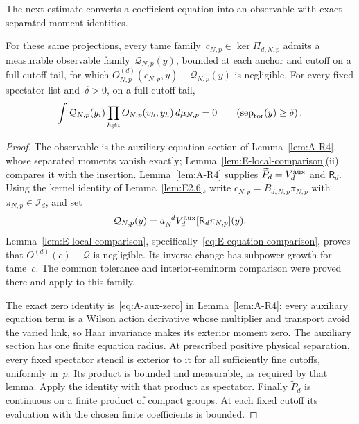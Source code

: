 The next estimate converts a coefficient equation into an observable with exact separated moment identities.
\begin{lemma}\label{lem:E2.7}
For these same projections, every tame family~$c_{N,p}\in\ker\Pi_{d,N,p}$ admits a measurable observable family~$\mathcal Q_{N,p}(y)$, bounded at each anchor and cutoff on a full cutoff tail, for which $O^{(d)}_{N,p}(c_{N,p},y)-\mathcal Q_{N,p}(y)$ is negligible. For every fixed spectator list and~$\delta>0$, on a full cutoff tail,
\begin{equation*}
\int \mathcal Q_{N,p}(y_i)\prod_{h\ne i}O_{N,p}(v_h,y_h)\,d\mu_{N,p}=0
\qquad(\operatorname{sep}_{\rm tor}(y)\ge\delta)\,.
\end{equation*}
\end{lemma}
\begin{proof}
The observable is the auxiliary equation section of Lemma~\ref{lem:A-R4}, whose separated moments vanish exactly; Lemma~\ref{lem:E-local-comparison}(ii) compares it with the insertion. Lemma~\ref{lem:A-R4} supplies $\widetilde P_d=V_d^{\rm aux}$ and $\mathsf R_d$. Using the kernel identity of Lemma~\ref{lem:E2.6}, write $c_{N,p}=B_{d,N,p}\pi_{N,p}$ with $\pi_{N,p}\in\mathcal I_d$, and set
\begin{equation}\label{eq:E-equation-section}
 \mathcal Q_{N,p}(y)=a_N^{-d}V_d^{\rm aux}[\mathsf R_d\pi_{N,p}](y).
\end{equation}
Lemma~\ref{lem:E-local-comparison}, specifically~\eqref{eq:E-equation-comparison}, proves that $O^{(d)}(c)-\mathcal Q$ is negligible. Its inverse change has subpower growth for tame~$c$. The common tolerance and interior-seminorm comparison were proved there and apply to this family.

The exact zero identity is~\eqref{eq:A-aux-zero} in Lemma~\ref{lem:A-R4}: every auxiliary equation term is a Wilson action derivative whose multiplier and transport avoid the varied link, so Haar invariance makes its exterior moment zero. The auxiliary section has one finite equation radius. At prescribed positive physical separation, every fixed spectator stencil is exterior to it for all sufficiently fine cutoffs, uniformly in~$p$. Its product is bounded and measurable, as required by that lemma. Apply the identity with that product as spectator. Finally $\widetilde P_d$ is continuous on a finite product of compact groups. At each fixed cutoff its evaluation with the chosen finite coefficients is bounded.
\end{proof}

